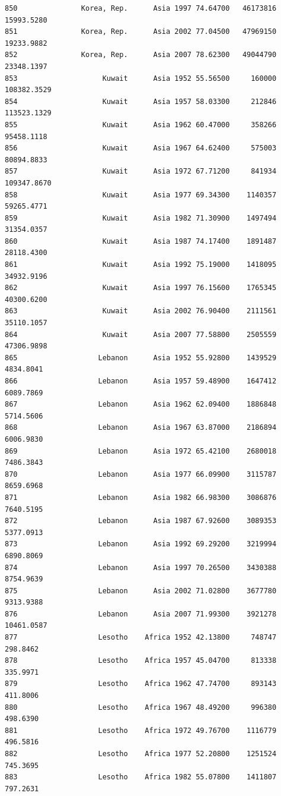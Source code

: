\documentclass[
  letterpaper,
  DIV=11,
  numbers=noendperiod]{scrreprt}
\begin{document}
\begin{verbatim}
850               Korea, Rep.      Asia 1997 74.64700   46173816  15993.5280
851               Korea, Rep.      Asia 2002 77.04500   47969150  19233.9882
852               Korea, Rep.      Asia 2007 78.62300   49044790  23348.1397
853                    Kuwait      Asia 1952 55.56500     160000 108382.3529
854                    Kuwait      Asia 1957 58.03300     212846 113523.1329
855                    Kuwait      Asia 1962 60.47000     358266  95458.1118
856                    Kuwait      Asia 1967 64.62400     575003  80894.8833
857                    Kuwait      Asia 1972 67.71200     841934 109347.8670
858                    Kuwait      Asia 1977 69.34300    1140357  59265.4771
859                    Kuwait      Asia 1982 71.30900    1497494  31354.0357
860                    Kuwait      Asia 1987 74.17400    1891487  28118.4300
861                    Kuwait      Asia 1992 75.19000    1418095  34932.9196
862                    Kuwait      Asia 1997 76.15600    1765345  40300.6200
863                    Kuwait      Asia 2002 76.90400    2111561  35110.1057
864                    Kuwait      Asia 2007 77.58800    2505559  47306.9898
865                   Lebanon      Asia 1952 55.92800    1439529   4834.8041
866                   Lebanon      Asia 1957 59.48900    1647412   6089.7869
867                   Lebanon      Asia 1962 62.09400    1886848   5714.5606
868                   Lebanon      Asia 1967 63.87000    2186894   6006.9830
869                   Lebanon      Asia 1972 65.42100    2680018   7486.3843
870                   Lebanon      Asia 1977 66.09900    3115787   8659.6968
871                   Lebanon      Asia 1982 66.98300    3086876   7640.5195
872                   Lebanon      Asia 1987 67.92600    3089353   5377.0913
873                   Lebanon      Asia 1992 69.29200    3219994   6890.8069
874                   Lebanon      Asia 1997 70.26500    3430388   8754.9639
875                   Lebanon      Asia 2002 71.02800    3677780   9313.9388
876                   Lebanon      Asia 2007 71.99300    3921278  10461.0587
877                   Lesotho    Africa 1952 42.13800     748747    298.8462
878                   Lesotho    Africa 1957 45.04700     813338    335.9971
879                   Lesotho    Africa 1962 47.74700     893143    411.8006
880                   Lesotho    Africa 1967 48.49200     996380    498.6390
881                   Lesotho    Africa 1972 49.76700    1116779    496.5816
882                   Lesotho    Africa 1977 52.20800    1251524    745.3695
883                   Lesotho    Africa 1982 55.07800    1411807    797.2631

\end{verbatim}
\end{document}
